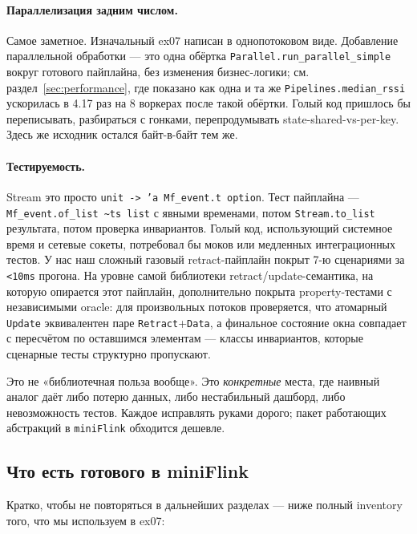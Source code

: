 \paragraph{Параллелизация задним числом.} Самое заметное.
Изначальный ex07 написан в однопотоковом виде. Добавление
параллельной обработки --- это одна обёртка
\texttt{Parallel.run\_parallel\_simple} вокруг готового пайплайна,
без изменения бизнес-логики; см. раздел~\ref{sec:performance}, где
показано как одна и та же
\texttt{Pipelines.median\_rssi} ускорилась в 4.17 раз на 8 воркерах
после такой обёртки. Голый код пришлось бы переписывать, разбираться
с гонками, перепродумывать state-shared-vs-per-key. Здесь же
исходник остался байт-в-байт тем же.

\paragraph{Тестируемость.} Stream это просто \texttt{unit ->
'a Mf\_event.t option}. Тест пайплайна --- \texttt{Mf\_event.of\_list
\textasciitilde ts list} с явными временами, потом \texttt{Stream.to\_list}
результата, потом проверка инвариантов. Голый код, использующий
системное время и сетевые сокеты, потребовал бы моков или медленных
интеграционных тестов. У нас наш сложный газовый retract-пайплайн
покрыт 7-ю сценариями за \texttt{<10ms} прогона. На уровне самой
библиотеки retract/update-семантика, на которую опирается этот
пайплайн, дополнительно покрыта property-тестами с независимыми
oracle: для произвольных потоков проверяется, что атомарный
\texttt{Update} эквивалентен паре \texttt{Retract}+\texttt{Data}, а
финальное состояние окна совпадает с пересчётом по оставшимся
элементам --- классы инвариантов, которые сценарные тесты структурно
пропускают.

\medskip\noindent
Это не «библиотечная польза вообще». Это \emph{конкретные} места,
где наивный аналог даёт либо потерю данных, либо нестабильный
дашборд, либо невозможность тестов. Каждое исправлять руками
дорого; пакет работающих абстракций в \texttt{miniFlink} обходится
дешевле.

\subsection{Что есть готового в miniFlink}

Кратко, чтобы не повторяться в дальнейших разделах --- ниже
полный inventory того, что мы используем в ex07:

